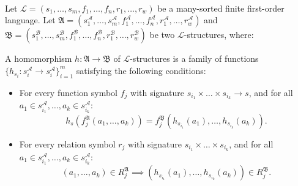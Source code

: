 \begin{definition}\ \\
    Let \( \mathcal{L} = (s_1, \dots, s_m, f_1, \dots, f_n, r_1, \dots, r_w) \) be a many-sorted finite first-order language.  
    Let \( \mathfrak{A} = (s_1^\mathcal{A}, \dots, s_m^\mathcal{A}, f_1^\mathcal{A}, \dots, f_n^\mathcal{A}, r_1^\mathcal{A}, \dots, r_w^\mathcal{A}) \) and \( \mathfrak{B} =  (s_1^\mathcal{B}, \dots, s_m^\mathcal{B}, f_1^\mathcal{B}, \dots, f_n^\mathcal{B}, r_1^\mathcal{B}, \dots, r_w^\mathcal{B}) \) be two \( \mathcal{L} \)-structures, where:

A homomorphism \( h: \mathfrak{A} \to \mathfrak{B} \) of $\mathcal{L}$-structures is a family of functions \( \{h_{s_i} : s_i^\mathcal{A} \to s_i^\mathcal{A}\}_{i=1}^m \) satisfying the following conditions:
\begin{itemize}
    \item For every function symbol \( f_j \) with signature \( s_{i_1} \times \dots \times s_{i_k} \to s \), and for all \( a_1 \in s_{i_1}^\mathcal{A}, \dots, a_k \in s_{i_k}^\mathcal{A} \):  
    \[
    h_s\left(f_j^\mathfrak{A}(a_1, \dots, a_k)\right) = f_j^\mathfrak{B}\left(h_{s_{i_1}}(a_1), \dots, h_{s_{i_k}}(a_k)\right).
    \]
    \item For every relation symbol \( r_j \) with signature \( s_{i_1} \times \dots \times s_{i_k} \), and for all \( a_1 \in s_{i_1}^\mathcal{A}, \dots, a_k \in s_{i_k}^\mathcal{A} \):  
    \[
    (a_1, \dots, a_k) \in R_j^\mathfrak{A} \implies \left(h_{s_{i_1}}(a_1),  \dots, h_{s_{i_k}}(a_k)\right) \in R_j^\mathfrak{B}.
    \]
\end{itemize}
\end{definition}



